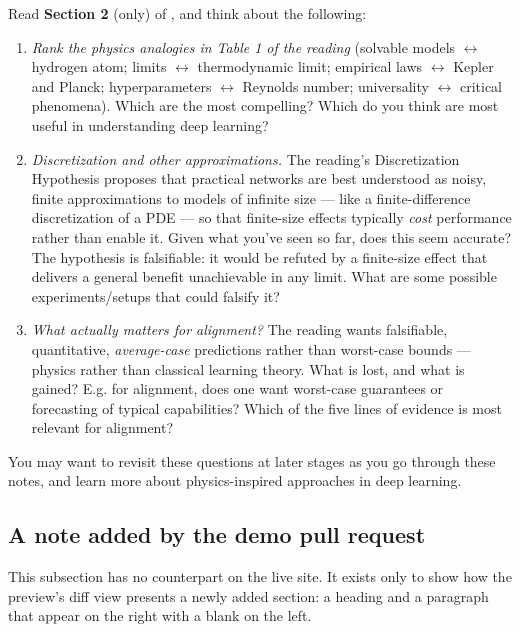 \documentclass[11pt]{article}
\begin{document}
Read \textbf{Section 2} (only) of \cite{simon2026scientific}, and think about the following:

\begin{enumerate}
  \item \emph{Rank the physics analogies in Table 1 of the reading}
  (solvable models $\leftrightarrow$ hydrogen atom; limits
  $\leftrightarrow$ thermodynamic limit; empirical laws $\leftrightarrow$
  Kepler and Planck; hyperparameters $\leftrightarrow$ Reynolds number;
  universality $\leftrightarrow$ critical phenomena). Which are the most compelling? Which do you think are most useful in understanding deep learning?
  
  \item \emph{Discretization and other approximations.} The reading's
  Discretization Hypothesis proposes that practical networks are best
  understood as noisy, finite approximations to models of infinite size --- like a finite-difference discretization of a PDE --- so that finite-size
  effects typically \emph{cost} performance rather than enable it. Given what you've seen so far, does this seem accurate? The hypothesis is falsifiable: it would be refuted by a finite-size effect that delivers a general benefit unachievable in any limit. What are some possible experiments/setups that could falsify it?
  
  \item \emph{What actually matters for alignment?} The reading wants falsifiable, quantitative, \emph{average-case}
  predictions rather than worst-case bounds --- physics rather than
  classical learning theory. What is lost, and what is gained? E.g. for alignment, does one want worst-case guarantees or forecasting of typical capabilities?
  Which of the five lines of evidence is most relevant for alignment?
\end{enumerate}

\noindent You may want to revisit these questions at later stages as you go through these notes, and learn more about physics-inspired approaches in deep learning.

\subsection{A note added by the demo pull request}

This subsection has no counterpart on the live site. It exists only to show
how the preview's diff view presents a newly added section: a heading and a
paragraph that appear on the right with a blank on the left.
\end{document}
